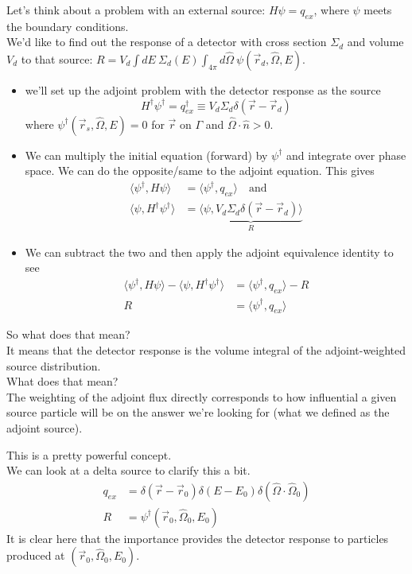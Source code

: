 \documentclass[12pt]{article}
\newcommand{\rvec}{\ensuremath{\vec{r}}}
\newcommand{\vOmega}{\ensuremath{\hat{\Omega}}}
\begin{document}
Let's think about a problem with an external source: $H \psi = q_{ex}$, where $\psi$ meets the boundary conditions.\\
We'd like to find out the response of a detector with cross section $\Sigma_d$ and volume $V_d$ to that source: $R = V_d \int dE\: \Sigma_d(E) \int_{4\pi} d\vOmega \: \psi(\rvec_d, \vOmega, E)$. \\
\begin{itemize}
\item we'll set up the adjoint problem with the detector response as the source
\[H^{\dagger}\psi^{\dagger} = q_{ex}^{\dagger} \equiv V_d \Sigma_d \delta(\rvec - \rvec_d)\]
where $\psi^{\dagger}(\vec{r}_s, \vOmega, E) = 0$ for $\rvec$ on $\Gamma$ and $\vOmega \cdot \hat{n} > 0$.
%
\item We can multiply the initial equation (forward) by $\psi^{\dagger}$ and integrate over phase space. We can do the opposite/same to the adjoint equation. This gives
\begin{align*}
\langle\psi^{\dagger}, H\psi\rangle &= \langle\psi^{\dagger}, q_{ex}\rangle \quad \text{and}\\
\langle\psi, H^{\dagger} \psi^{\dagger}\rangle &= \underbrace{\langle\psi, V_d \Sigma_d \delta(\rvec - \rvec_d)\rangle }_R
\end{align*}
%
\item We can subtract the two and then apply the adjoint equivalence identity to see
\begin{align*}
\langle\psi^{\dagger}, H\psi\rangle - \langle\psi, H^{\dagger} \psi^{\dagger}\rangle &= \langle\psi^{\dagger}, q_{ex}\rangle - R \\
R &= \langle\psi^{\dagger}, q_{ex}\rangle
\end{align*}
\end{itemize}
%
So what does that mean? \\
It means that the detector response is the volume integral of the adjoint-weighted source distribution. \\
What does that mean? \\
The weighting of the adjoint flux directly corresponds to how influential a given source particle will be on the answer we're looking for (what we defined as the adjoint source).

This is a pretty powerful concept. \\
We can look at a delta source to clarify this a bit.
\begin{align*}
q_{ex} &= \delta(\rvec - \rvec_0) \delta(E - E_0) \delta(\vOmega \cdot \vOmega_0) \\
R &= \psi^{\dagger}(\rvec_0, \vOmega_0, E_0)
\end{align*}
It is clear here that the importance provides the detector response to particles produced at $(\rvec_0, \vOmega_0, E_0)$.
\end{document}
